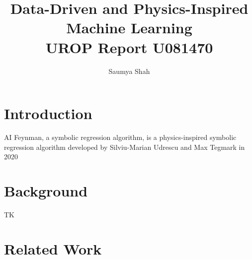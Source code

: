 \documentclass[fleqn,10pt]{olplainarticle}
\title{Data-Driven and Physics-Inspired Machine Learning\\[1ex] \large UROP Report U081470}
\author{Saumya Shah}
\begin{document}
\maketitle

\flushbottom

\thispagestyle{empty}

\tableofcontents

\section{Introduction}
AI Feynman, a symbolic regression algorithm, is a physics-inspired symbolic regression algorithm developed by Silviu-Marian Udrescu and Max Tegmark in 2020



\section{Background}
TK

\section{Related Work}
\end{document}
